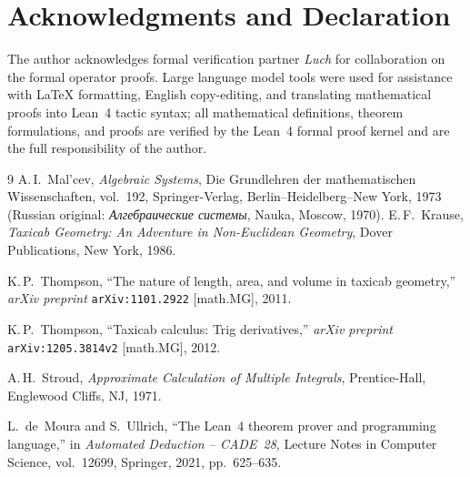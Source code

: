 \documentclass[11pt,a4paper]{article}
\theoremstyle{plain}
\theoremstyle{definition}
\begin{document}
\section*{Acknowledgments and Declaration}
The author acknowledges formal verification partner \emph{Luch} for collaboration on the formal operator proofs. Large language model tools were used for assistance with \LaTeX{} formatting, English copy-editing, and translating mathematical proofs into Lean~4 tactic syntax; all mathematical definitions, theorem formulations, and proofs are verified by the Lean~4 formal proof kernel and are the full responsibility of the author.

\begin{thebibliography}{9}
A.\,I.~Mal'cev, \emph{Algebraic Systems}, Die Grundlehren der mathematischen Wissenschaften, vol.~192, Springer-Verlag, Berlin--Heidelberg--New York, 1973 (Russian original: \emph{Алгебраические системы}, Nauka, Moscow, 1970).
E.\,F.~Krause, \emph{Taxicab Geometry: An Adventure in Non-Euclidean Geometry}, Dover Publications, New York, 1986.

K.\,P.~Thompson, ``The nature of length, area, and volume in taxicab geometry,'' \emph{arXiv preprint} \texttt{arXiv:1101.2922} [math.MG], 2011.

K.\,P.~Thompson, ``Taxicab calculus: Trig derivatives,'' \emph{arXiv preprint} \texttt{arXiv:1205.3814v2} [math.MG], 2012.

A.\,H.~Stroud, \emph{Approximate Calculation of Multiple Integrals}, Prentice-Hall, Englewood Cliffs, NJ, 1971.

L.~de~Moura and S.~Ullrich, ``The Lean~4 theorem prover and programming language,'' in \emph{Automated Deduction -- CADE~28}, Lecture Notes in Computer Science, vol.~12699, Springer, 2021, pp.~625--635.
\end{thebibliography}
\end{document}
